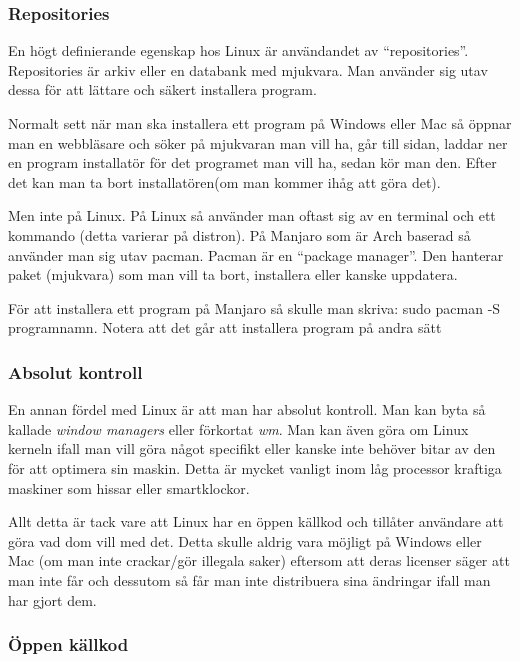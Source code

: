 \documentclass[12pt, a4paper]{report}
\begin{document}
   \subsubsection{Repositories}

    En högt definierande egenskap hos Linux är användandet av ``repositories''. Repositories är arkiv eller en databank med mjukvara. Man använder sig utav dessa för att lättare och säkert installera program.

    Normalt sett när man ska installera ett program på Windows eller Mac så öppnar man en webbläsare och söker på mjukvaran man vill ha, går till sidan, laddar ner en program installatör för det programet man vill ha, sedan kör man den. Efter det kan man ta bort installatören(om man kommer ihåg att göra det).
    
    Men inte på Linux. På Linux så använder man oftast sig av en terminal och ett kommando (detta varierar på distron).
    På Manjaro som är Arch baserad så använder man sig utav pacman\cite{pacman}. Pacman är en ``package manager''\cite{pkgmanager}. Den hanterar paket (mjukvara) som man vill ta bort, installera eller kanske uppdatera.

    För att installera ett program på Manjaro så skulle man skriva: sudo pacman -S programnamn. Notera att det går att installera program på andra sätt


    \subsubsection{Absolut kontroll}

   En annan fördel med Linux är att man har absolut kontroll. Man kan byta så kallade \textit{window managers} eller förkortat \textit{wm}\cite{wm}. Man kan även göra om Linux kerneln ifall man vill göra något specifikt eller kanske inte behöver bitar av den för att optimera sin maskin. Detta är mycket vanligt inom låg processor kraftiga maskiner som hissar eller smartklockor.

   Allt detta är tack vare att Linux har en öppen källkod och tillåter användare att göra vad dom vill med det. Detta skulle aldrig vara möjligt på Windows eller Mac (om man inte crackar/gör illegala saker) eftersom att deras licenser säger att man inte får och dessutom så får man inte distribuera sina ändringar ifall man har gjort dem.

   \subsubsection{Öppen källkod}
\end{document}
